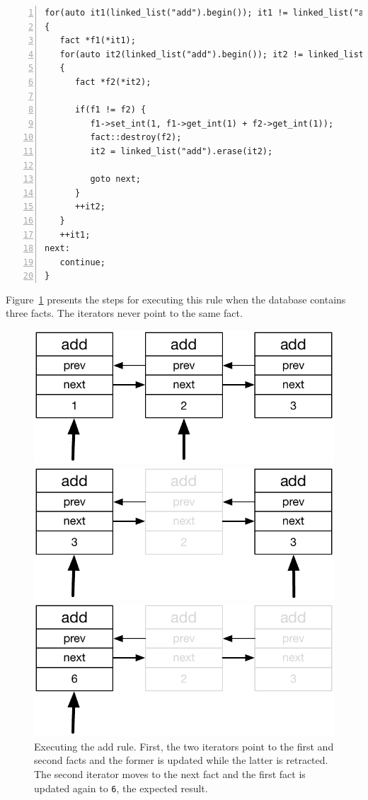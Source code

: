 \begin{Verbatim}[numbers=left,fontsize=\scriptsize]
for(auto it1(linked_list("add").begin()); it1 != linked_list("add").end(); )
{
   fact *f1(*it1);
   for(auto it2(linked_list("add").begin()); it2 != linked_list("add").end(); )
   {
      fact *f2(*it2);

      if(f1 != f2) {
         f1->set_int(1, f1->get_int(1) + f2->get_int(1));
         fact::destroy(f2);
         it2 = linked_list("add").erase(it2);

         goto next;
      }
      ++it2;
   }
   ++it1;
next:
   continue;
}
\end{Verbatim}

Figure~\ref{fig:update_add} presents the steps for executing this rule when the
database contains three facts. The iterators never point to the same fact.

\begin{figure}
\centering
\begin{minipage}{.5\textwidth}
  \centering
  \includegraphics[width=.8\linewidth]{figures/update}
\end{minipage}%
\begin{minipage}{.5\textwidth}
  \centering
  \includegraphics[width=0.8\linewidth]{figures/update2}
\end{minipage}
\begin{minipage}{.5\textwidth}
   \centering
  \includegraphics[width=0.8\linewidth]{figures/update3}
\end{minipage}
\caption{Executing the add rule. First, the two iterators point to
   the first and second facts and the former is updated while the latter is
   retracted. The second iterator moves to the next fact and the first fact is
   updated again to \texttt{6}, the expected result.}
\label{fig:update_add}
\end{figure}

